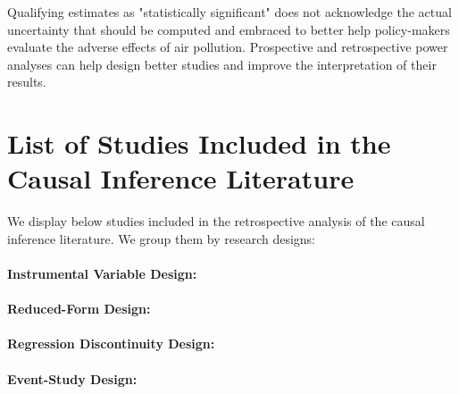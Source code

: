 \documentclass[12pt]{article}
\begin{document}
        Qualifying estimates as "statistically significant" does not acknowledge the actual uncertainty that should be computed and embraced to better help policy-makers evaluate the adverse effects of air pollution. Prospective and retrospective power analyses can help design better studies and improve the interpretation of their results.
        
\setlength\bibsep{0pt}



\pagebreak

\appendix

\section{List of Studies Included in the Causal Inference Literature} \label{causal_lit}
\setcounter{figure}{0}
\renewcommand\thefigure{\thesection.\arabic{figure}}   


We display below studies included in the retrospective analysis of the causal inference literature. We group them by research designs:

\paragraph{Instrumental Variable Design:} \cite{moretti_pollution_2011, ebenstein_particulate_2015, schwartz_estimating_2015, arceo_does_2016, he_effect_2016, knittel_caution_2016, schlenker_airports_2016, sheldon_impact_2017, schwartz_estimating_2017, zhong_traffic_2017, barwick_morbidity_2018, hanlon2018london, schwartz_national_2018, halliday_vog_2019, deryugina_mortality_2019, cheung_mitigating_2020, fan_impact_2020, he_straw_2020, giaccherini_when_2021, godzinski_disentangling_2021, guidetti_placebo_2021, kim_air_2021, liu_effect_2021, xia_short-term_2022}

\paragraph{Reduced-Form Design:} \cite{bauernschuster_when_2017, jans_economic_2018, jia_is_2019, godzinski2019short}

\paragraph{Regression Discontinuity Design:} \cite{chen_air_2018, fan_winter_2020, anderson2022bounds}

\paragraph{Event-Study Design:} \cite{mullins_effects_2015, simeonova_congestion_2021}
\end{document}
